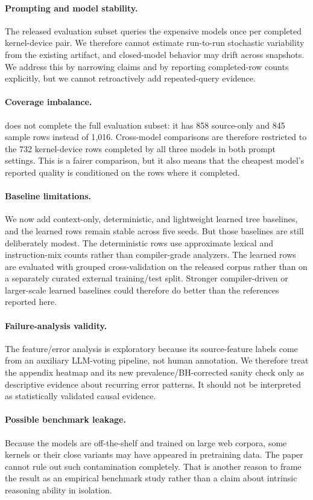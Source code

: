 \paragraph{Prompting and model stability.}
The released evaluation subset queries the expensive models once per completed kernel-device pair.
We therefore cannot estimate run-to-run stochastic variability from the existing artifact, and closed-model behavior may drift across snapshots.
We address this by narrowing claims and by reporting completed-row counts explicitly, but we cannot retroactively add repeated-query evidence.

\paragraph{Coverage imbalance.}
\gptoss does not complete the full evaluation subset: it has 858 source-only and 845 \sourcesass sample rows instead of 1{,}016.
Cross-model comparisons are therefore restricted to the 732 kernel-device rows completed by all three models in both prompt settings.
This is a fairer comparison, but it also means that the cheapest model's reported quality is conditioned on the rows where it completed.

\paragraph{Baseline limitations.}
We now add context-only, deterministic, and lightweight learned tree baselines, and the learned rows remain stable across five seeds.
But those baselines are still deliberately modest.
The deterministic rows use approximate lexical and instruction-mix counts rather than compiler-grade analyzers.
The learned rows are evaluated with grouped cross-validation on the released corpus rather than on a separately curated external training/test split.
Stronger compiler-driven or larger-scale learned baselines could therefore do better than the references reported here.

\paragraph{Failure-analysis validity.}
The feature/error analysis is exploratory because its source-feature labels come from an auxiliary LLM-voting pipeline, not human annotation.
We therefore treat the appendix heatmap and its new prevalence/BH-corrected sanity check only as descriptive evidence about recurring error patterns.
It should not be interpreted as statistically validated causal evidence.

\paragraph{Possible benchmark leakage.}
Because the models are off-the-shelf and trained on large web corpora, some kernels or their close variants may have appeared in pretraining data.
The paper cannot rule out such contamination completely.
That is another reason to frame the result as an empirical benchmark study rather than a claim about intrinsic reasoning ability in isolation.
